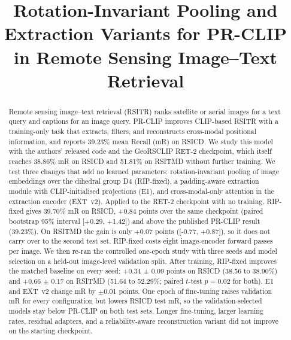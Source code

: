 \documentclass[conference]{IEEEtran}
\begin{document}
\title{Rotation-Invariant Pooling and Extraction Variants for PR-CLIP in Remote Sensing Image--Text Retrieval}

\author{
\and
{}
}

\maketitle

\begin{abstract}
Remote sensing image--text retrieval (RSITR) ranks satellite or aerial images for a text query and captions for an image query. PR-CLIP improves CLIP-based RSITR with a training-only task that extracts, filters, and reconstructs cross-modal positional information, and reports 39.23\% mean Recall (mR) on RSICD. We study this model with the authors' released code and the GeoRSCLIP RET-2 checkpoint, which itself reaches 38.86\% mR on RSICD and 51.81\% on RSITMD without further training. We test three changes that add no learned parameters: rotation-invariant pooling of image embeddings over the dihedral group D4 (RIP-fixed), a padding-aware extraction module with CLIP-initialised projections (E1), and cross-modal-only attention in the extraction encoder (EXT~v2). Applied to the RET-2 checkpoint with no training, RIP-fixed gives 39.70\% mR on RSICD, +0.84 points over the same checkpoint (paired bootstrap 95\% interval [+0.29, +1.42]) and above the published PR-CLIP result (39.23\%). On RSITMD the gain is only +0.07 points ([-0.77, +0.87]), so it does not carry over to the second test set. RIP-fixed costs eight image-encoder forward passes per image. We then re-ran the controlled one-epoch study with three seeds and model selection on a held-out image-level validation split. After training, RIP-fixed improves the matched baseline on every seed: +0.34 $\pm$ 0.09 points on RSICD (38.56 to 38.90\%) and +0.66 $\pm$ 0.17 on RSITMD (51.64 to 52.29\%; paired $t$-test $p=0.02$ for both). E1 and EXT~v2 change mR by $\pm$0.01 points. One epoch of fine-tuning raises validation mR for every configuration but lowers RSICD test mR, so the validation-selected models stay below PR-CLIP on both test sets. Longer fine-tuning, larger learning rates, residual adapters, and a reliability-aware reconstruction variant did not improve on the starting checkpoint.
\end{abstract}
\end{document}
